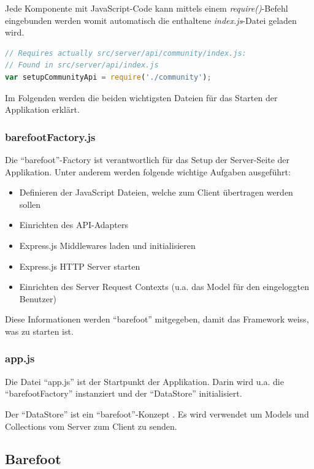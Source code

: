 Jede Komponente mit JavaScript-Code kann mittels einem \emph{require()}-Befehl eingebunden werden womit automatisch die enthaltene \emph{index.js}-Datei geladen wird.


\begin{lstlisting}[language=JavaScript, caption=Einbindung der Community-Komponente, float=ht!]
// Requires actually src/server/api/community/index.js:
// Found in src/server/api/index.js
var setupCommunityApi = require('./community');
\end{lstlisting}

Im Folgenden werden die beiden wichtigsten Dateien für das Starten der Applikation erklärt.

\subsubsection*{barefootFactory.js}
Die ``barefoot''-Factory \cite{barefootFactoryjs} ist verantwortlich für das Setup der Server-Seite der Applikation.
Unter anderem werden folgende wichtige Aufgaben ausgeführt:
\begin{itemize}
	\item Definieren der JavaScript Dateien, welche zum Client übertragen werden sollen
	\item Einrichten des API-Adapters
	\item Express.js \cite{Expressjs} Middlewares laden und initialisieren
	\item Express.js \cite{Expressjs} HTTP Server starten
	\item Einrichten des Server Request Contexts (u.a. das Model für den eingeloggten Benutzer)
\end{itemize}

Diese Informationen werden ``barefoot'' \cite{Barefoot} mitgegeben, damit das Framework weiss, was zu starten ist.

\subsubsection*{app.js}
Die Datei ``app.js'' \cite{appjs} ist der Startpunkt der Applikation.
Darin wird u.a. die ``barefootFactory'' instanziert und der ``DataStore'' initialisiert.

Der ``DataStore'' ist ein ``barefoot''-Konzept \cite{barefootDatastore}. Es wird verwendet um Models und Collections vom Server zum Client zu senden.

\subsection{Barefoot}

